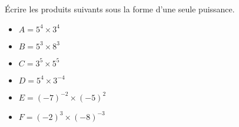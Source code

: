 \begin{exercice*}    
    Écrire les produits suivants sous la forme d'une seule puissance.
    \begin{multicols}{2}
        \begin{itemize}
            \item[] $A=5^4\times 3^4$
            \item[] $B=5^3\times 8^3$
            \item[] $C=3^5\times 5^5$
            \item[] $D=5^4\times 3^{-4}$
            \item[] $E=(-7)^{-2}\times (-5)^2$
            \item[] $F=(-2)^3\times (-8)^{-3}$
        \end{itemize}
    \end{multicols}
    
\end{exercice*}
